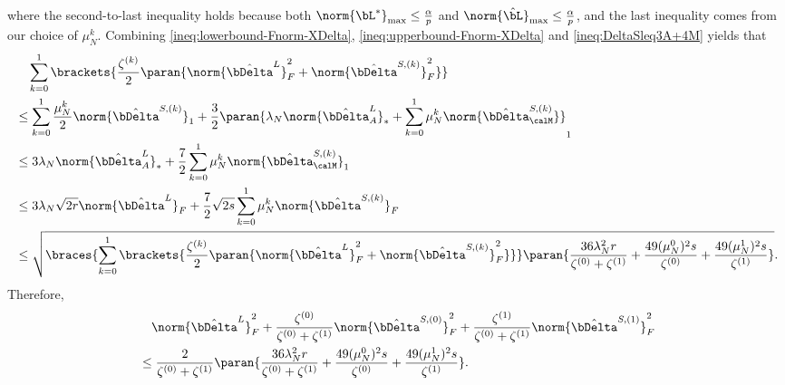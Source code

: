 	   where the second-to-last inequality holds because both $\norm{\bL^*}_{\max} \leq \frac{\alpha}{p}$ and $\norm{\hat \bL}_{\max} \leq \frac{\alpha}{p}$, and the last inequality comes from our choice of $\mu_N^k$. Combining \eqref{ineq:lowerbound-Fnorm-XDelta}, \eqref{ineq:upperbound-Fnorm-XDelta} and \eqref{ineq:DeltaSleq3A+4M} yields that
	   \begin{equation}
	   	\begin{aligned}
	   			   	&\quad\sum_{k=0}^1\brackets{\frac{\zeta^{(k)}}{2} \paran{\norm{\hat\bDelta^L}_F^2 + \norm{\hat\bDelta^{S, (k)}}_F^2}}\\ & \leq \sum_{k=0}^1 \frac{\mu_N^k}{2}\norm{\hat\bDelta^{S, (k)}}_1 + \frac{3}{2}\paran{\lambda_N\norm{\hat\bDelta^{L}_A}_* + \sum_{k=0}^1\mu^k_N\norm{\hat\bDelta^{S, (k)}_{\calM}}}_1\\
	   			   	&\leq 3\lambda_N\norm{\hat\bDelta^{L}_A}_* + \frac{7}{2} \sum_{k=0}^1\mu^k_N\norm{\hat\bDelta^{S, (k)}_{\calM}}_1\\
	   			   	&\leq 3\lambda_N\sqrt{2r}\norm{\hat\bDelta^{L}}_F+ \frac{7}{2}\sqrt{2s} \sum_{k=0}^1\mu^k_N\norm{\hat\bDelta^{S, (k)}}_F\\
	   			   	&\leq \sqrt{\braces{\sum_{k=0}^1\brackets{\frac{\zeta^{(k)}}{2} \paran{\norm{\hat\bDelta^L}_F^2 + \norm{\hat\bDelta^{S, (k)}}_F^2}}}\paran{\frac{36\lambda_N^2 r}{\zeta^{(0)}+\zeta^{(1)}}+\frac{49(\mu^0_N)^2 s}{\zeta^{(0)}}+\frac{49(\mu^1_N)^2 s}{\zeta^{(1)}}}}.
	   	\end{aligned}
	   \end{equation}
	   Therefore,
	  \begin{equation}
	   	\begin{aligned}
	   		&\quad\norm{\hat\bDelta^L}_F^2+\dfrac{\zeta^{(0)}}{\zeta^{(0)}+ \zeta^{(1)}}\norm{\hat\bDelta^{S, (0)}}_F^2+\dfrac{\zeta^{(1)}}{\zeta^{(0)}+ \zeta^{(1)}}\norm{\hat\bDelta^{S, (1)}}_F^2\\
	   		&\leq \frac{2}{\zeta^{(0)}+\zeta^{(1)}}\paran{\frac{36\lambda_N^2 r}{\zeta^{(0)}+\zeta^{(1)}}+\frac{49(\mu^0_N)^2 s}{\zeta^{(0)}}+\frac{49(\mu^1_N)^2 s}{\zeta^{(1)}}}.
	   	\end{aligned}
	   \end{equation}

